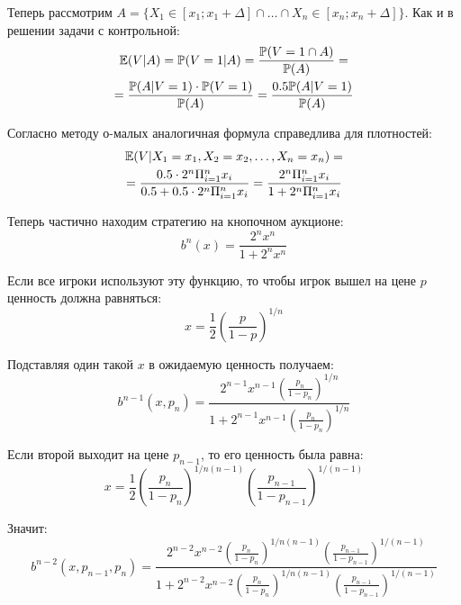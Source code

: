 \begin{enumerate}
Теперь рассмотрим $ A=\{X_{1}\in[x_{1};x_{1}+\Delta] \cap \ldots  \cap X_{n}\in[x_{n};x_{n}+\Delta]\} $. Как и в решении задачи с контрольной:
\begin{multline}
\mathbb{E}(V|A)=\mathbb{P}(V=1|A)=\frac{\mathbb{P}(V=1 \cap A)}{\mathbb{P}(A)}=\\
=\frac{\mathbb{P}(A|V=1)\cdot \mathbb{P}(V=1)}{\mathbb{P}(A)}=\frac{0.5\mathbb{P}(A|V=1)}{\mathbb{P}(A)}
\end{multline}

Согласно методу о-малых аналогичная формула справедлива для плотностей:
\begin{multline}
\mathbb{E}(V|X_{1}=x_{1},X_{2}=x_{2},\ldots ,X_{n}=x_{n})=\\
=\frac{0.5\cdot 2^{n}\Pi_{i=1}^{n}x_{i}}{0.5+0.5\cdot 2^{n}\Pi_{i=1}^{n}x_{i}}
=\frac{2^{n}\Pi_{i=1}^{n}x_{i}}{1+ 2^{n}\Pi_{i=1}^{n}x_{i}}
\end{multline}

Теперь частично находим стратегию на кнопочном аукционе:
\begin{equation}
b^{n}(x)=\frac{2^{n}x^{n}}{1+2^{n}x^{n}}
\end{equation}

Если все игроки используют эту функцию, то чтобы игрок вышел на цене $ p $ ценность должна равняться:
\begin{equation}
x=\frac{1}{2}\left(\frac{p}{1-p} \right)^{1/n}
\end{equation}

Подставляя один такой $ x $ в ожидаемую ценность получаем:
\begin{equation}
b^{n-1}(x,p_{n})=\frac{2^{n-1}x^{n-1}\left(\frac{p_{n}}{1-p_{n}} \right)^{1/n}}{1+2^{n-1}x^{n-1}\left(\frac{p_{n}}{1-p_{n}} \right)^{1/n}}
\end{equation}

Если второй выходит на цене $ p_{n-1} $, то его ценность была равна:
\begin{equation}
x=\frac{1}{2}\left(\frac{p_{n}}{1-p_{n}} \right)^{1/n(n-1)}\left(\frac{p_{n-1}}{1-p_{n-1}} \right)^{1/(n-1)}
\end{equation}

Значит:
\begin{equation}
b^{n-2}(x,p_{n-1},p_{n})=\frac{2^{n-2}x^{n-2}\left(\frac{p_{n}}{1-p_{n}} \right)^{1/n(n-1)}\left(\frac{p_{n-1}}{1-p_{n-1}} \right)^{1/(n-1)}}{1+2^{n-2}x^{n-2}\left(\frac{p_{n}}{1-p_{n}} \right)^{1/n(n-1)}\left(\frac{p_{n-1}}{1-p_{n-1}} \right)^{1/(n-1)}}
\end{equation}



\end{enumerate}
